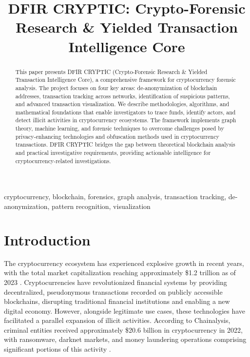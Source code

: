 \documentclass[conference]{IEEEtran}
\begin{document}
\title{DFIR CRYPTIC: Crypto-Forensic Research \& Yielded Transaction Intelligence Core}

\author{
}

\maketitle

\begin{abstract}
This paper presents DFIR CRYPTIC (Crypto-Forensic Research \& Yielded Transaction Intelligence Core), a comprehensive framework for cryptocurrency forensic analysis. The project focuses on four key areas: de-anonymization of blockchain addresses, transaction tracking across networks, identification of suspicious patterns, and advanced transaction visualization. We describe methodologies, algorithms, and mathematical foundations that enable investigators to trace funds, identify actors, and detect illicit activities in cryptocurrency ecosystems. The framework implements graph theory, machine learning, and forensic techniques to overcome challenges posed by privacy-enhancing technologies and obfuscation methods used in cryptocurrency transactions. DFIR CRYPTIC bridges the gap between theoretical blockchain analysis and practical investigative requirements, providing actionable intelligence for cryptocurrency-related investigations.
\end{abstract}

\begin{IEEEkeywords}
cryptocurrency, blockchain, forensics, graph analysis, transaction tracking, de-anonymization, pattern recognition, visualization
\end{IEEEkeywords}

\section{Introduction}

The cryptocurrency ecosystem has experienced explosive growth in recent years, with the total market capitalization reaching approximately \$1.2 trillion as of 2023 \cite{chainanalysis2022}. Cryptocurrencies have revolutionized financial systems by providing decentralized, pseudonymous transactions recorded on publicly accessible blockchains, disrupting traditional financial institutions and enabling a new digital economy. However, alongside legitimate use cases, these technologies have facilitated a parallel expansion of illicit activities. According to Chainalysis, criminal entities received approximately \$20.6 billion in cryptocurrency in 2022, with ransomware, darknet markets, and money laundering operations comprising significant portions of this activity \cite{chainanalysis2022}.
\end{document}
